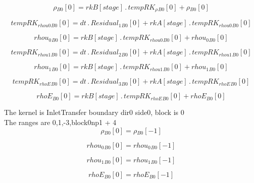 \documentclass{article}
\begin{document}
\begin{dmath}{\rho{_{B0}}}[{0}] = {rkB}[{stage}] \,.\, {tempRK_{\rho}{_{B0}}}[{0}] + {\rho{_{B0}}}[{0}]\end{dmath}

\begin{dmath}{tempRK_{rhou0}{_{B0}}}[{0}] = dt \,.\, {Residual_{1}{_{B0}}}[{0}] + {rkA}[{stage}] \,.\, {tempRK_{rhou0}{_{B0}}}[{0}]\end{dmath}

\begin{dmath}{rhou_{0}{_{B0}}}[{0}] = {rkB}[{stage}] \,.\, {tempRK_{rhou0}{_{B0}}}[{0}] + {rhou_{0}{_{B0}}}[{0}]\end{dmath}

\begin{dmath}{tempRK_{rhou1}{_{B0}}}[{0}] = dt \,.\, {Residual_{2}{_{B0}}}[{0}] + {rkA}[{stage}] \,.\, {tempRK_{rhou1}{_{B0}}}[{0}]\end{dmath}

\begin{dmath}{rhou_{1}{_{B0}}}[{0}] = {rkB}[{stage}] \,.\, {tempRK_{rhou1}{_{B0}}}[{0}] + {rhou_{1}{_{B0}}}[{0}]\end{dmath}

\begin{dmath}{tempRK_{rhoE}{_{B0}}}[{0}] = dt \,.\, {Residual_{3}{_{B0}}}[{0}] + {rkA}[{stage}] \,.\, {tempRK_{rhoE}{_{B0}}}[{0}]\end{dmath}

\begin{dmath}{rhoE{_{B0}}}[{0}] = {rkB}[{stage}] \,.\, {tempRK_{rhoE}{_{B0}}}[{0}] + {rhoE{_{B0}}}[{0}]\end{dmath}

\noindent The kernel is InletTransfer boundary dir0 side0, block is 0\\\noindent The ranges are 0,1,-3,block0np1 + 4\\\begin{dmath}{\rho{_{B0}}}[{0}] = {\rho{_{B0}}}[{-1}]\end{dmath}

\begin{dmath}{rhou_{0}{_{B0}}}[{0}] = {rhou_{0}{_{B0}}}[{-1}]\end{dmath}

\begin{dmath}{rhou_{1}{_{B0}}}[{0}] = {rhou_{1}{_{B0}}}[{-1}]\end{dmath}

\begin{dmath}{rhoE{_{B0}}}[{0}] = {rhoE{_{B0}}}[{-1}]\end{dmath}
\end{document}
